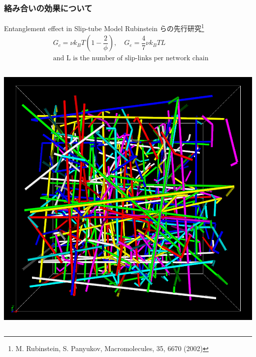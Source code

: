 \documentclass[aspectratio=169,11pt, dvipdfmx]{beamer}
\begin{document}
\begin{frame}
    \frametitle{絡み合いの効果について}
	\vspace{-3mm}
	\begin{alertblock}{Entanglement effect in Slip-tube Model}
			\small
			Rubinstein らの先行研究\footnote{
				\scriptsize{M. Rubinstein, S. Panyukov, Macromolecules, 35, 6670 (2002)}
				}
			\vspace{-3mm}
			\scriptsize
			\begin{align*}
				&G_c = \nu k_B T \left(1-\dfrac{2}{\phi} \right), \quad G_e = \dfrac{4}{7} \nu k_B T L \\
				& \text{and L is the number of slip-links per network chain}
			\end{align*}
	\end{alertblock}
	\begin{columns}[onlytextwidth]
			\centering
			\includegraphics[width=\textwidth]{z_cord_NPT_4Chain.png}


\end{columns}
\end{frame}
\end{document}
